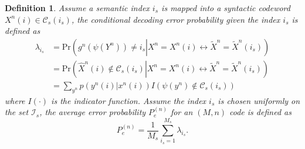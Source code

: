 \documentclass[12pt, draftclsnofoot,onecolumn]{IEEEtran}
\newtheorem{definition}{\bf{Definition}}
\begin{document}
\begin{definition}
Assume a semantic index $i_s$ is mapped into a syntactic codeword $X^n(i)\in \mathcal{C}_s(i_s)$, the conditional decoding error probability given the index $i_s$ is defined as
\begin{equation}
\begin{aligned}
\lambda_{i_s}&=\text{Pr}\left(g^n\left(\psi \left(Y^n\right)\right)\neq i_s \left|X^n=X^n(i)\leftrightarrow\tilde{X}^n=\tilde{X}^n(i_s)\right.\right)\\
      &=\text{Pr}\left(\hat{X}^n(i) \notin \mathcal{C}_s(i_s) \left|X^n=X^n(i)\leftrightarrow\tilde{X}^n=\tilde{X}^n(i_s)\right.\right)\\
      &=\sum_{y^n}p\left(y^n(i)\left|x^n(i)\right.\right) I\left(\psi(y^n)\notin \mathcal{C}_s(i_s)\right)
\end{aligned}
\end{equation}
where $I(\cdot)$ is the indicator function.
Assume the index $i_s$ is chosen uniformly on the set $\mathcal{I}_s$, the average error probability $P_e^{(n)}$ for an $(M,n)$ code is defined as
\begin{equation}
P_e^{(n)}=\frac{1}{M_s} \sum_{i_s=1}^{M_s} \lambda_{i_s}.
\end{equation}

\end{definition}
\end{document}
